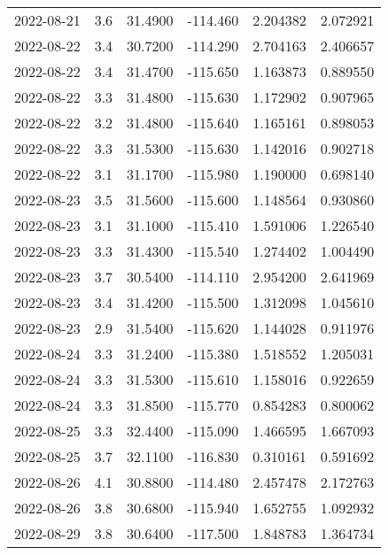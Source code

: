 \begin{tabular}{lrrrrr}
2022-08-21 &       3.6 &  31.4900 &  -114.460 &         2.204382 &         2.072921 \\
2022-08-22 &       3.4 &  30.7200 &  -114.290 &         2.704163 &         2.406657 \\
2022-08-22 &       3.4 &  31.4700 &  -115.650 &         1.163873 &         0.889550 \\
2022-08-22 &       3.3 &  31.4800 &  -115.630 &         1.172902 &         0.907965 \\
2022-08-22 &       3.2 &  31.4800 &  -115.640 &         1.165161 &         0.898053 \\
2022-08-22 &       3.3 &  31.5300 &  -115.630 &         1.142016 &         0.902718 \\
2022-08-22 &       3.1 &  31.1700 &  -115.980 &         1.190000 &         0.698140 \\
2022-08-23 &       3.5 &  31.5600 &  -115.600 &         1.148564 &         0.930860 \\
2022-08-23 &       3.1 &  31.1000 &  -115.410 &         1.591006 &         1.226540 \\
2022-08-23 &       3.3 &  31.4300 &  -115.540 &         1.274402 &         1.004490 \\
2022-08-23 &       3.7 &  30.5400 &  -114.110 &         2.954200 &         2.641969 \\
2022-08-23 &       3.4 &  31.4200 &  -115.500 &         1.312098 &         1.045610 \\
2022-08-23 &       2.9 &  31.5400 &  -115.620 &         1.144028 &         0.911976 \\
2022-08-24 &       3.3 &  31.2400 &  -115.380 &         1.518552 &         1.205031 \\
2022-08-24 &       3.3 &  31.5300 &  -115.610 &         1.158016 &         0.922659 \\
2022-08-24 &       3.3 &  31.8500 &  -115.770 &         0.854283 &         0.800062 \\
2022-08-25 &       3.3 &  32.4400 &  -115.090 &         1.466595 &         1.667093 \\
2022-08-25 &       3.7 &  32.1100 &  -116.830 &         0.310161 &         0.591692 \\
2022-08-26 &       4.1 &  30.8800 &  -114.480 &         2.457478 &         2.172763 \\
2022-08-26 &       3.8 &  30.6800 &  -115.940 &         1.652755 &         1.092932 \\
2022-08-29 &       3.8 &  30.6400 &  -117.500 &         1.848783 &         1.364734 \\

\end{tabular}

